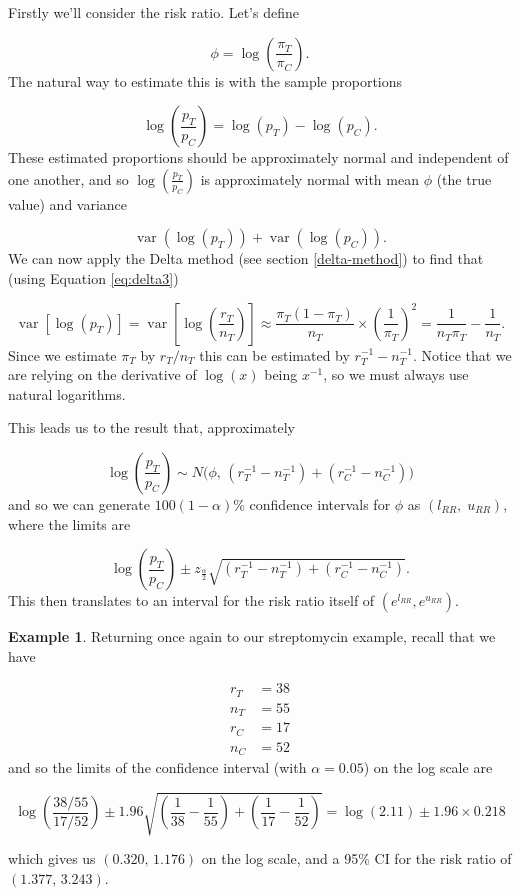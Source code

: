 \documentclass[
  openany]{book}
\theoremstyle{definition}
\theoremstyle{definition}
\newtheorem{example}{Example}[chapter]
\theoremstyle{definition}
\theoremstyle{definition}
\theoremstyle{remark}
\begin{document}
Firstly we'll consider the risk ratio. Let's define

\[ \phi = \log\left(\frac{\pi_T}{\pi_C}\right).\]
The natural way to estimate this is with the sample proportions

\[\log\left(\frac{p_T}{p_C}\right) = \log\left(p_T\right) - \log\left(p_C\right).\]
These estimated proportions should be approximately normal and independent of one another, and so \(\log\left(\frac{p_T}{p_C}\right)\) is approximately normal with mean \(\phi\) (the true value) and variance

\[\operatorname{var}\left(\log\left(p_T\right)\right) + \operatorname{var}\left(\log\left(p_C\right)\right). \]
We can now apply the Delta method (see section \ref{delta-method}) to find that (using Equation \eqref{eq:delta3})

\[\operatorname{var}\left[\log\left(p_T\right)\right] = \operatorname{var}\left[\log\left(\frac{r_T}{n_T}\right)\right] \approx \frac{\pi_T\left(1-\pi_T\right)}{n_T}\times{\left(\frac{1}{\pi_T}\right)^2} = \frac{1}{n_T\pi_T} - \frac{1}{n_T}. \]
Since we estimate \(\pi_T\) by \(r_T/n_T\) this can be estimated by \(r_T^{-1} - n_T^{-1}\). Notice that we are relying on the derivative of \(\log\left(x\right)\) being \(x^{-1}\), so we must always use natural logarithms.

This leads us to the result that, approximately

\[\log\left(\frac{p_T}{p_C}\right) \sim N\bigg(\phi,\,\left(r_T^{-1} - n_T^{-1}\right) + \left(r_C^{-1} - n_C^{-1}\right) \bigg) \] and so we can generate \(100\left(1-\alpha\right)\)\% confidence intervals for \(\phi\) as \(\left(l_{RR},\;u_{RR}\right)\), where the limits are

\[
\log\left(\frac{p_T}{p_C}\right) \pm z_{\frac{\alpha}{2}}\sqrt{\left(r_T^{-1} - n_T^{-1}\right) + \left(r_C^{-1} - n_C^{-1}\right)}.
\]
This then translates to an interval for the risk ratio itself of \(\left(e^{l_{RR}},e^{u_{RR}}\right)\).

\begin{example}
Returning once again to our streptomycin example, recall that we have

\[
\begin{aligned}
r_T & = 38\\
n_T & = 55 \\
r_C & = 17 \\
n_C & = 52
\end{aligned}
\]
and so the limits of the confidence interval (with \(\alpha=0.05\)) on the log scale are

\[\log\left(\frac{38/55}{17/52}\right) \pm 1.96\sqrt{\left(\frac{1}{38} - \frac{1}{55}\right) + \left(\frac{1}{17} - \frac{1}{52}\right)} = \log(2.11) \pm 1.96 \times 0.218\]

which gives us \(\left(0.320,\,1.176\right)\) on the log scale, and a 95\% CI for the risk ratio of \(\left(1.377,\,3.243\right)\).
\end{example}
\end{document}
